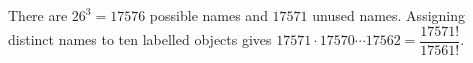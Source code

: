 There are $26^3=17576$ possible names and $17571$ unused names. Assigning distinct names to ten labelled objects gives $\boxed{17571\cdot17570\cdots17562}=\boxed{\dfrac{17571!}{17561!}}$.
